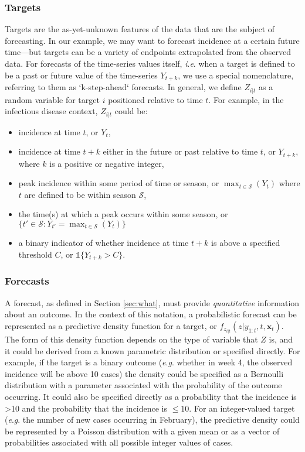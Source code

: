 \documentclass[a4paper]{article}
\newcommand{\ie}{\textit{i}.\textit{e}. }
\newcommand{\eg}{\textit{e}.\textit{g}. }
\begin{document}
\subsubsection*{Targets}

Targets are the as-yet-unknown features of the data that are the subject of forecasting.
In our example, we may want to forecast incidence at a certain future time---but targets can be a variety of endpoints extrapolated from the observed data.
For forecasts of the time-series values itself, \ie when a target is defined to be a past or future value of the time-series $Y_{t+k}$, we use a special nomenclature, referring to them as `k-step-ahead` forecasts.  
In general, we define $Z_{i|t}$ as a random variable for target $i$ positioned relative to time $t$. For example, in the infectious disease context, $Z_{i|t}$ could be:
\begin{itemize}
 	\item incidence at time $t$, or $Y_t$,
    \item incidence at time $t+k$ either in the future or past relative to time $t$, or $Y_{t+k}$, where $k$ is a positive or negative integer,
    \item peak incidence within some period of time or season, or $\max_{t\in \mathcal{S}} (Y_t)$ where $t$ are defined to be within season $\mathcal{S}$,
    \item the time(s) at which a peak occurs within some season, or $\{ t' \in \mathcal{S} : Y_{t'} = \max_{t\in \mathcal{S}} (Y_t) \} $
    \item a binary indicator of whether incidence at time $t+k$ is above a specified threshold $C$, or $\mathds{1} \{Y_{t+k}>C\}$.
\end{itemize}

\subsubsection*{Forecasts}

A forecast, as defined in Section \ref{sec:what}, must provide {\em quantitative} information about an outcome.
In the context of this notation, a probabilistic forecast can be represented as a predictive density function for a target, or $f_{z_{i|t}}(z|y_{1:t}, t, \mathbf{x}_{t})$.
The form of this density function depends on the type of variable that $Z$ is, and it could be derived from a known parametric distribution or specified directly.
For example, if the target is a binary outcome (\eg whether in week 4, the observed incidence will be above 10 cases) the density could be specified as a Bernoulli distribution with a parameter associated with the probability of the outcome occurring.
It could also be specified directly as a probability that the incidence is >10 and the probability that the incidence is $\leq 10$.
For an integer-valued target (\eg the number of new cases occurring in February), the predictive density could be represented by a Poisson distribution with a given mean or as a vector of probabilities associated with all possible integer values of cases.
\end{document}
